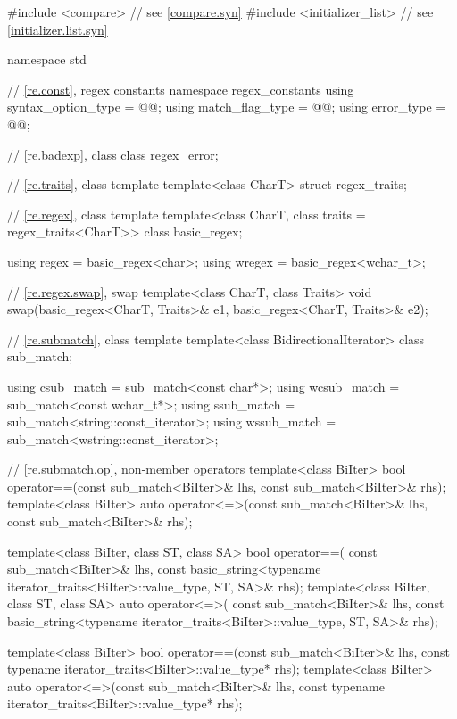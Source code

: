 %
%
%
%
\begin{codeblock}
#include <compare>              // see \ref{compare.syn}
#include <initializer_list>     // see \ref{initializer.list.syn}

namespace std {
  // \ref{re.const}, regex constants
  namespace regex_constants {
    using syntax_option_type = @@;
    using match_flag_type = @@;
    using error_type = @@;
  }

  // \ref{re.badexp}, class 
  class regex_error;

  // \ref{re.traits}, class template 
  template<class CharT> struct regex_traits;

  // \ref{re.regex}, class template 
  template<class CharT, class traits = regex_traits<CharT>> class basic_regex;

  using regex  = basic_regex<char>;
  using wregex = basic_regex<wchar_t>;

  // \ref{re.regex.swap},  swap
  template<class CharT, class Traits>
    void swap(basic_regex<CharT, Traits>& e1, basic_regex<CharT, Traits>& e2);

  // \ref{re.submatch}, class template 
  template<class BidirectionalIterator>
    class sub_match;

  using csub_match  = sub_match<const char*>;
  using wcsub_match = sub_match<const wchar_t*>;
  using ssub_match  = sub_match<string::const_iterator>;
  using wssub_match = sub_match<wstring::const_iterator>;

  // \ref{re.submatch.op},  non-member operators
  template<class BiIter>
    bool operator==(const sub_match<BiIter>& lhs, const sub_match<BiIter>& rhs);
  template<class BiIter>
    auto operator<=>(const sub_match<BiIter>& lhs, const sub_match<BiIter>& rhs);

  template<class BiIter, class ST, class SA>
    bool operator==(
      const sub_match<BiIter>& lhs,
      const basic_string<typename iterator_traits<BiIter>::value_type, ST, SA>& rhs);
  template<class BiIter, class ST, class SA>
    auto operator<=>(
      const sub_match<BiIter>& lhs,
      const basic_string<typename iterator_traits<BiIter>::value_type, ST, SA>& rhs);

  template<class BiIter>
    bool operator==(const sub_match<BiIter>& lhs,
                    const typename iterator_traits<BiIter>::value_type* rhs);
  template<class BiIter>
    auto operator<=>(const sub_match<BiIter>& lhs,
                     const typename iterator_traits<BiIter>::value_type* rhs);

}
\end{codeblock}

